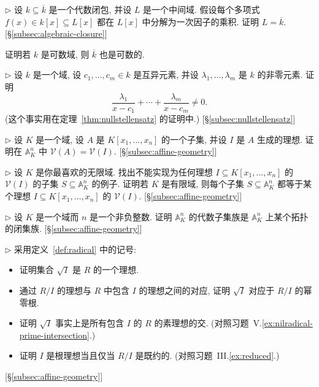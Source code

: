 \begin{prob}\label{ex:alg-closure-minimal}
$\triangleright$ 设 $k\subseteq\overline{k}$ 是一个代数闭包, 并设 $L$ 是一个中间域. 假设每个多项式 $f(x)\in k[x]\subseteq L[x]$ 都在 $L[x]$ 中分解为一次因子的乘积. 证明 $L=\overline{k}$. [§\ref{subsec:algebraic-closure}]
\end{prob}

\begin{prob}\label{ex:countable-closure}
证明若 $k$ 是可数域, 则 $\overline{k}$ 也是可数的.
\end{prob}

\begin{prob}\label{ex:partial-fractions-nonzero}
$\triangleright$ 设 $k$ 是一个域, 设 $c_1,\ldots ,c_m\in k$ 是互异元素, 并设 $\lambda_1,\ldots ,\lambda_m$ 是 $k$ 的非零元素. 证明
\[
\frac{\lambda_1}{x-c_1}+\cdots +\frac{\lambda_m}{x-c_m}\neq 0.
\]
(这个事实用在定理~\ref{thm:nullstellensatz} 的证明中.) [§\ref{subsec:nullstellensatz}]
\end{prob}

\begin{prob}\label{ex:V-of-ideal-generated}
$\triangleright$ 设 $K$ 是一个域, 设 $A$ 是 $K[x_1,\ldots ,x_n]$ 的一个子集, 并设 $I$ 是 $A$ 生成的理想. 证明在 $\mathbb{A}_K^n$ 中 $\mathcal{V}(A)=\mathcal{V}(I)$. [§\ref{subsec:affine-geometry}]
\end{prob}

\begin{prob}\label{ex:non-algebraic-subsets}
$\triangleright$ 设 $K$ 是你最喜欢的无限域. 找出不能实现为任何理想 $I\subseteq K[x_1,\ldots ,x_n]$ 的 $\mathcal{V}(I)$ 的子集 $S\subseteq\mathbb{A}_K^n$ 的例子. 证明若 $K$ 是有限域, 则每个子集 $S\subseteq\mathbb{A}_K^n$ 都等于某个理想 $I\subseteq K[x_1,\ldots ,x_n]$ 的 $\mathcal{V}(I)$. [§\ref{subsec:affine-geometry}]
\end{prob}

\begin{prob}\label{ex:zariski-topology}
$\triangleright$ 设 $K$ 是一个域而 $n$ 是一个非负整数. 证明 $\mathbb{A}_K^n$ 的代数子集族是 $\mathbb{A}_K^n$ 上某个拓扑的闭集族. [§\ref{subsec:affine-geometry}]
\end{prob}

\begin{prob}\label{ex:radical-props}
$\triangleright$ 采用定义~\ref{def:radical} 中的记号:
\begin{itemize}
\item 证明集合 $\sqrt{I}$ 是 $R$ 的一个理想.
\item 通过 $R/I$ 的理想与 $R$ 中包含 $I$ 的理想之间的对应, 证明 $\sqrt{I}$ 对应于 $R/I$ 的幂零根.
\item 证明 $\sqrt{I}$ 事实上是所有包含 $I$ 的 $R$ 的素理想的交. (对照习题~V.\ref{ex:nilradical-prime-intersection}.)
\item 证明 $I$ 是根理想当且仅当 $R/I$ 是既约的. (对照习题~III.\ref{ex:reduced}.)
\end{itemize}
[§\ref{subsec:affine-geometry}]
\end{prob}

